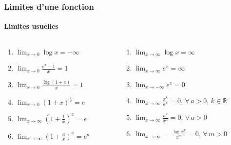 \documentclass[10pt,notheorems]{beamer}
\theoremstyle{plain}
\theoremstyle{definition} %
\begin{document}
\begin{frame}
  \frametitle{Limites d'une fonction}
  \framesubtitle{Limites usuelles}

  \bigskip


  \begin{columns}
    \begin{column}{.5\textwidth}
      \begin{enumerate}
      \item $\lim_{x\rightarrow 0}\log x = -\infty$
      \item $\lim_{x\rightarrow 0}\frac{e^x-1}{x} = 1$
      \item $\lim_{x\rightarrow 0}\frac{\log(1+x)}{x} = 1$
      \item $\lim_{x\rightarrow 0} \left(1+x\right)^{\frac{1}{x}} = e$
      \item $\lim_{x\rightarrow\infty}\left(1+\frac{1}{x}\right)^x = e$
      \item $\lim_{x\rightarrow\infty}\left(1+\frac{a}{x}\right)^x = e^a$
      \end{enumerate}
      \setcounter{enumcounter}{\value{enumi}}
    \end{column}
    \begin{column}{.5\textwidth}
      \begin{enumerate}
        \setcounter{enumi}{\value{enumcounter}}
      \item $\lim_{x\rightarrow \infty}\log x = \infty$
      \item $\lim_{x\rightarrow \infty}e^x = \infty$
      \item $\lim_{x\rightarrow -\infty}e^x = 0$
      \item $\lim_{x\rightarrow\infty}\frac{x^k}{a^x} = 0$, $\forall\, a>0$, $k\in \mathbb R$
      \item $\lim_{x\rightarrow\infty}\frac{a^x}{x^x} = 0$, $\forall\, a>0$
      \item $\lim_{x\rightarrow\infty} = \frac{\log x^k}{x^m} = 0$, $\forall\, m>0$
      \end{enumerate}
    \end{column}
  \end{columns}

\end{frame}
\end{document}
